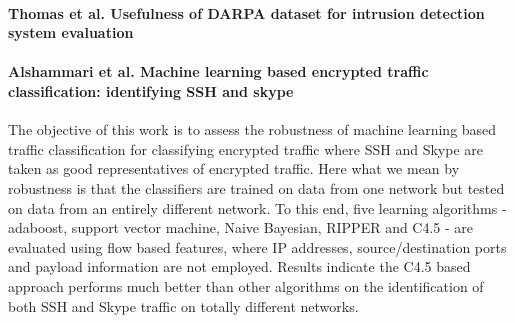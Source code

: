 %

\paragraph*{Thomas et al. Usefulness of DARPA dataset for intrusion detection system evaluation}
\cite{thomas2010usefulness}


\paragraph*{Alshammari et al. Machine learning based encrypted traffic classification: identifying SSH and skype}
\cite{alshammari2009machine}
The objective of this work is to assess the robustness of machine learning based traffic classification for classifying encrypted traffic where SSH and Skype are taken as good representatives of encrypted traffic. Here what we mean by robustness is that the classifiers are trained on data from one network but tested on data from an entirely different network. To this end, five learning algorithms - adaboost, support vector machine, Naive Bayesian, RIPPER and C4.5 - are evaluated using flow based features, where IP addresses, source/destination ports and payload information are not employed. Results indicate the C4.5 based approach performs much better than other algorithms on the identification of both SSH and Skype traffic on totally different networks.


